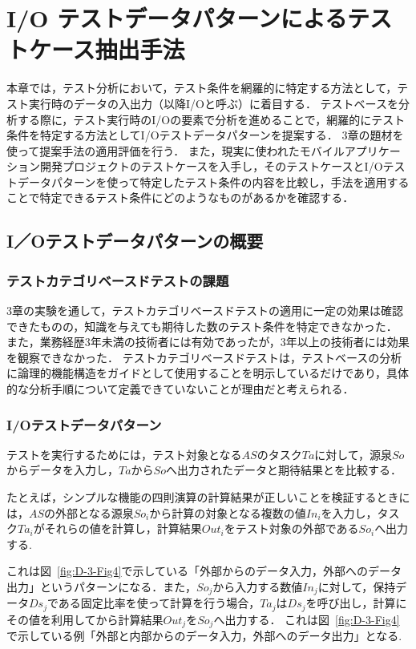 
\chapter{I/O テストデータパターンによるテストケース抽出手法}\label{chap:4}
本章では，テスト分析において，テスト条件を網羅的に特定する方法として，テスト実行時のデータの入出力（以降I/Oと呼ぶ）に着目する．
テストベースを分析する際に，テスト実行時のI/Oの要素で分析を進めることで，網羅的にテスト条件を特定する方法としてI/Oテストデータパターンを提案する．
3章の題材を使って提案手法の適用評価を行う．
また，現実に使われたモバイルアプリケーション開発プロジェクトのテストケースを入手し，そのテストケースとI/Oテストデータパターンを使って特定したテスト条件の内容を比較し，手法を適用することで特定できるテスト条件にどのようなものがあるかを確認する．

\newpage
\section{I／Oテストデータパターンの概要} \label{sec:4-1}
\subsection{テストカテゴリベースドテストの課題} \label{sec:4-1-1}
3章の実験を通して，テストカテゴリベースドテストの適用に一定の効果は確認できたものの，知識を与えても期待した数のテスト条件を特定できなかった．
また，業務経歴3年未満の技術者には有効であったが，3年以上の技術者には効果を観察できなかった．
テストカテゴリベースドテストは，テストベースの分析に論理的機能構造をガイドとして使用することを明示しているだけであり，具体的な分析手順について定義できていないことが理由だと考えられる．

\subsection{I/Oテストデータパターン} \label{sec:4-1-1}
テストを実行するためには，テスト対象となる$AS$のタスク$Ta$に対して，源泉$So$からデータを入力し，$Ta$から$So$へ出力されたデータと期待結果とを比較する．

たとえば，シンプルな機能の四則演算の計算結果が正しいことを検証するときには，$AS$の外部となる源泉$So_i$から計算の対象となる複数の値$In_i$を入力し，タスク$Ta_i$がそれらの値を計算し，計算結果$Out_i$をテスト対象の外部である$So_i$へ出力する.

これは図~\ref{fig:D-3-Fig4}で示している「外部からのデータ入力，外部へのデータ出力」というパターンになる．また，$So_j$から入力する数値$In_j$に対して，保持データ$Ds_j$である固定比率を使って計算を行う場合，$Ta_j$は$Ds_j$を呼び出し，計算にその値を利用してから計算結果$Out_j$を$So_j$へ出力する．
これは図~\ref{fig:D-3-Fig4}で示している例「外部と内部からのデータ入力，外部へのデータ出力」となる.

